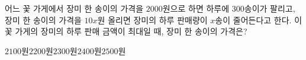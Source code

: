 어느 꽃 가게에서 장미 한 송이의 가격을 $2000$원으로 하면 하루에 $300$송이가 팔리고, 장미 한 송이의 가격을 $10x$원 올리면 장미의 하루 판매량이 $x$송이 줄어든다고 한다. 이 꽃 가게의 장미의 하루 판매 금액이 최대일 때, 장미 한 송이의 가격은?
\begin{choices32}{$2100$원}{$2200$원}{$2300$원}{$2400$원}{$2500$원}\end{choices32}
